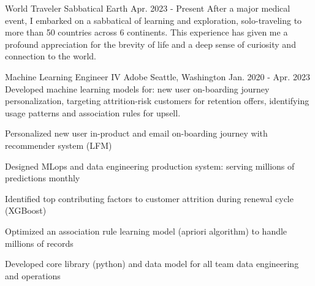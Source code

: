 

\begin{cventries}

\cventry
    {World Traveler} %
    {Sabbatical} %
    {Earth} %
    {Apr. 2023 - Present} %
    {After a major medical event, I embarked on a sabbatical of learning and exploration, solo-traveling to more than 50 countries across 6 continents. This experience has given me a profound appreciation for the brevity of life and a deep sense of curiosity and connection to the world.} %
    {}

\cventry
    {Machine Learning Engineer IV} %
    {Adobe} %
    {Seattle, Washington} %
    {Jan. 2020 - Apr. 2023} %
    {Developed machine learning models for: new user on-boarding journey personalization, targeting attrition-risk customers for retention offers, identifying usage patterns and association rules for upsell.} %
    {
      \begin{cvitems} %
        \item {Personalized new user in-product and email on-boarding journey with recommender system (LFM)}
        \item {Designed MLops and data engineering production system: serving millions of predictions monthly}
        \item {Identified top contributing factors to customer attrition during renewal cycle (XGBoost)}
        \item {Optimized an association rule learning model (apriori algorithm) to handle millions of records}
        \item {Developed core library (python) and data model for all team data engineering and operations}
      \end{cvitems}
    }


\end{cventries}
